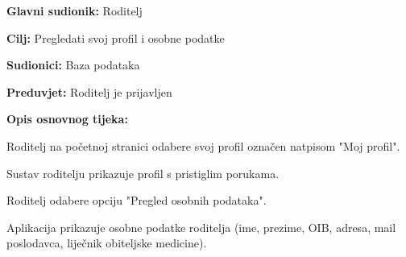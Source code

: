 					\noindent {}
					\begin{packed_item}
						
						\item \textbf{Glavni sudionik: }Roditelj
						\item  \textbf{Cilj:} Pregledati svoj profil i osobne podatke
						\item  \textbf{Sudionici:} Baza podataka
						\item  \textbf{Preduvjet:} Roditelj je prijavljen
						\item  \textbf{Opis osnovnog tijeka:}
						
						\item[] \begin{packed_enum}
							
							\item Roditelj na početnoj stranici odabere svoj profil označen natpisom "Moj profil". 
							\item Sustav roditelju prikazuje profil s pristiglim porukama.
							\item Roditelj odabere opciju "Pregled osobnih podataka".
							\item Aplikacija prikazuje osobne podatke roditelja (ime, prezime, OIB, adresa, mail poslodavca, liječnik obiteljske medicine).
						\end{packed_enum}
						
						
					\end{packed_item}
					
